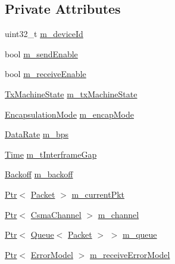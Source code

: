 \subsection*{Private Attributes}
\begin{DoxyCompactItemize}
\item 
uint32\+\_\+t \hyperlink{classns3_1_1CsmaNetDevice_a8cfc188ed680554dfa0b70cc6fc5e5ba}{m\+\_\+device\+Id}
\item 
bool \hyperlink{classns3_1_1CsmaNetDevice_ac5bde9af7f582a6d707a68061c114fdf}{m\+\_\+send\+Enable}
\item 
bool \hyperlink{classns3_1_1CsmaNetDevice_a8d844dcce78846a16c9a52c752f9736f}{m\+\_\+receive\+Enable}
\item 
\hyperlink{classns3_1_1CsmaNetDevice_a46c532357164a954c46a01f05f8d78f4}{Tx\+Machine\+State} \hyperlink{classns3_1_1CsmaNetDevice_af07031cad3f8bd8c4b33ba77fa706e99}{m\+\_\+tx\+Machine\+State}
\item 
\hyperlink{classns3_1_1CsmaNetDevice_a176431468055d41f8e879e33a5362cad}{Encapsulation\+Mode} \hyperlink{classns3_1_1CsmaNetDevice_a3f4b374840119abfa65dbe2075533f39}{m\+\_\+encap\+Mode}
\item 
\hyperlink{classns3_1_1DataRate}{Data\+Rate} \hyperlink{classns3_1_1CsmaNetDevice_a3051c17d676b00f0b2e95291d16c3769}{m\+\_\+bps}
\item 
\hyperlink{classns3_1_1Time}{Time} \hyperlink{classns3_1_1CsmaNetDevice_ae581d7910d91ab9aaf760288ccf75c55}{m\+\_\+t\+Interframe\+Gap}
\item 
\hyperlink{classns3_1_1Backoff}{Backoff} \hyperlink{classns3_1_1CsmaNetDevice_a2cb5f9baf0a19a7ea6527002b0299403}{m\+\_\+backoff}
\item 
\hyperlink{classns3_1_1Ptr}{Ptr}$<$ \hyperlink{classns3_1_1Packet}{Packet} $>$ \hyperlink{classns3_1_1CsmaNetDevice_a83f2aa389f676dec6bd1ff056bd61942}{m\+\_\+current\+Pkt}
\item 
\hyperlink{classns3_1_1Ptr}{Ptr}$<$ \hyperlink{classns3_1_1CsmaChannel}{Csma\+Channel} $>$ \hyperlink{classns3_1_1CsmaNetDevice_a5c3ecdf9a63006b106dff1c110e736ff}{m\+\_\+channel}
\item 
\hyperlink{classns3_1_1Ptr}{Ptr}$<$ \hyperlink{classns3_1_1Queue}{Queue}$<$ \hyperlink{classns3_1_1Packet}{Packet} $>$ $>$ \hyperlink{classns3_1_1CsmaNetDevice_a499be4029c01107f7f16f5371843ffde}{m\+\_\+queue}
\item 
\hyperlink{classns3_1_1Ptr}{Ptr}$<$ \hyperlink{classns3_1_1ErrorModel}{Error\+Model} $>$ \hyperlink{classns3_1_1CsmaNetDevice_aeef9196f9c7c46c99a7f703dc46c0207}{m\+\_\+receive\+Error\+Model}

\end{DoxyCompactItemize}
